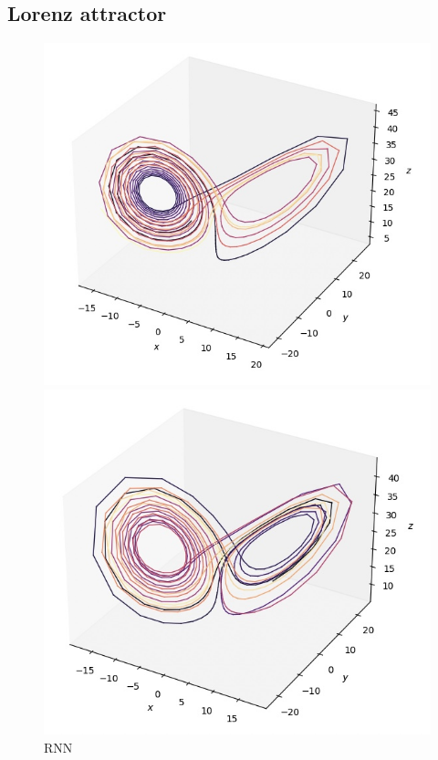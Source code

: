 \documentclass[11pt]{article}
\begin{document}
\subsection{Lorenz attractor}
\begin{figure}[ht]
    \centering
    \begin{minipage}{0.32\textwidth}
        \centering
        \includegraphics[width=\textwidth]{rnn_lorenz.jpeg}
        \caption{RNN}
        \label{fig:rnn_lorenz}
    \end{minipage}
    \hfill
    \begin{minipage}{0.32\textwidth}
        \centering
        \includegraphics[width=\textwidth]{echo_lorenz.jpeg}

\end{minipage}
\end{figure}
\end{document}
